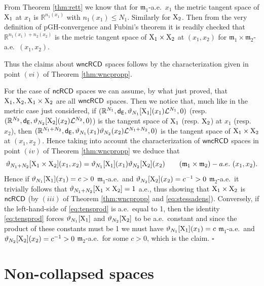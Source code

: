 \documentclass[reqno,11pt]{article}
\numberwithin{equation}{section}
\newcommand{\R}{\mathbb{R}}
\newcommand{\mm}{{\mbox{\boldmath$m$}}}
\newcommand{\sfd}{{\sf d}}
\renewcommand{\mm}{\mathfrak m}                                %
\renewenvironment{proof}{\removelastskip\par\medskip   %
\noindent{\em Proof} \rm}{\penalty-20\null\hfill$\square$\par\medbreak}
\newcommand{\X}{{\rm X}}
\newcommand{\ncRCD}{{\sf ncRCD}}
\newcommand{\wncRCD}{{\sf wncRCD}}
\newcommand{\Eu}{{\sf E}}
\begin{document}
\begin{proof} From Theorem \ref{thm:rett} we know that for $\mm_1$-a.e.\ $x_1$ the metric tangent space of $\X_1$ at $x_1$ is $\R^{n_1(x_1)}$ with $n_1(x_1)\leq N_1$. Similarly for $\X_2$. Then from the  very definition of pGH-convergence and Fubini's theorem it is readily checked that $\R^{n_1(x_1)+n_2(x_2)}$ is the metric tangent space of $\X_1\times\X_2$ at $(x_1,x_2)$ for $\mm_1\times\mm_2$-a.e.\ $(x_1,x_2)$. 

Thus the claims about $\wncRCD$ spaces follows by the characterization given in point $(vi)$ of Theorem \ref{thm:wncpropp}.


For the case of $\ncRCD$ spaces we can assume, by what just proved, that $\X_1,\X_2,\X_1\times\X_2$ are all $\wncRCD$ spaces. Then we notice that, much like in the metric case just considered, if $(\R^{N_1},\sfd_\Eu,\vartheta_{N_1}[\X_1](x_1)\mathcal L^{N_1},0)$ (resp. $(\R^{N_2},\sfd_\Eu,\vartheta_{N_2}[\X_2](x_2)\mathcal L^{N_2},0)$) is the tangent space of $\X_1$ (resp. $\X_2$) at $x_1$ (resp. $x_2$), then $(\R^{N_1+N_2},\sfd_\Eu,\vartheta_{N_1}(x_1)\vartheta_{N_2}(x_2)\mathcal L^{N_1+N_2},0)$ is the tangent space of $\X_1\times\X_2$ at $(x_1,x_2)$. Hence taking into account  the characterization  of $\wncRCD$ spaces in point $(iv)$ of Theorem \ref{thm:wncpropp} we deduce that
\begin{equation}
\label{eq:tensprod}
\vartheta_{N_1+N_2}[\X_1\times\X_2](x_1,x_2)=\vartheta_{N_1}[\X_1](x_1)\vartheta_{N_2}[\X_2](x_2)\qquad(\mm_1\times\mm_2)-a.e.\ (x_1,x_2).
\end{equation}
{ Hence if $\vartheta_{N_1}[\X_1](x_1)=c>0$ $\mm_1$-a.e.\ and $\vartheta_{N_2}[\X_2](x_2)=c^{-1}>0$ $\mm_2$-a.e.\ it trivially follows that $\vartheta_{N_1+N_2}[\X_1\times\X_2]=1$ a.e., thus showing that $\X_1\times\X_2$ is $\ncRCD$ (by $(iii)$ of Theorem \ref{thm:wncpropp} and \eqref{eq:stessadens}). Conversely, if the left-hand-side of \eqref{eq:tensprod} is a.e.\ equal to 1, then the identity \eqref{eq:tensprod} forces $\vartheta_{N_1}[\X_1]$ and $\vartheta_{N_2}[\X_2]$ to be a.e.\ constant and since the product of these constants must be 1 we must have $\vartheta_{N_1}[\X_1](x_1)=c$ $\mm_1$-a.e.\ and $\vartheta_{N_2}[\X_2](x_2)=c^{-1}>0$ $\mm_2$-a.e.\ for some $c>0$, which is the claim.}
\end{proof}



\section{Non-collapsed spaces}
\end{document}

